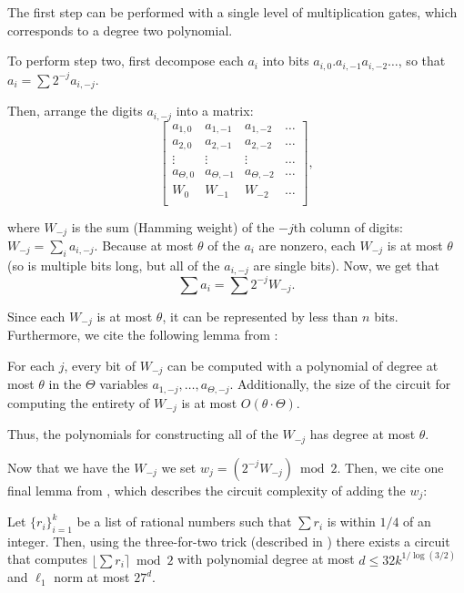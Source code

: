     The first step can be performed with a single level of multiplication gates, which corresponds to a degree two polynomial.

    To perform step two, first decompose each $a_i$ into bits $a_{i, 0} . a_{i, -1} a_{i, -2} \dots$, so that $a_i = \sum 2^{-j} a_{i, -j}$.

    Then, arrange the digits $a_{i, -j}$ into a matrix:
    \[\begin{bmatrix}
        a_{1, 0} & a_{1, -1} & a_{1, -2} & \dots \\
        a_{2, 0} & a_{2, -1} & a_{2, -2} & \dots \\
        \vdots & \vdots & \vdots & \dots \\
        a_{\Theta, 0} & a_{\Theta, -1} & a_{\Theta, -2} & \dots \\
        W_{0} & W_{-1} & W_{-2} & \dots \\
    \end{bmatrix},\]

    where $W_{-j}$ is the sum (Hamming weight) of the $-j$th column of digits: $W_{-j} = \sum_i a_{i, -j}$. Because at most $\theta$ of the $a_i$ are nonzero, each $W_{-j}$ is at most $\theta$ (so is multiple bits long, but all of the $a_{i, -j}$ are single bits). Now, we get that \[\sum a_i = \sum 2^{-j} W_{-j}.\]

    Since each $W_{-j}$ is at most $\theta$, it can be represented by less than $n$ bits. Furthermore, we cite the following lemma from \cite{dghv}:
    \begin{lemma}
        For each $j$, every bit of $W_{-j}$ can be computed with a polynomial of degree at most $\theta$ in the $\Theta$ variables $a_{1, -j}, \dots, a_{\Theta, -j}$. Additionally, the size of the circuit for computing the entirety of $W_{-j}$ is at most $O(\theta \cdot \Theta)$.
    \end{lemma}

    Thus, the polynomials for constructing all of the $W_{-j}$ has degree at most $\theta$.


    Now that we have the $W_{-j}$ we set $w_j = (2^{-j} W_{-j}) \bmod 2$. Then, we cite one final lemma from \cite{dghv}, which describes the circuit complexity of adding the $w_j$:
    \begin{lemma}
        Let $\{r_i\}_{i = 1}^k$ be a list of rational numbers such that $\sum r_i$ is within $1/4$ of an integer. Then, using the three-for-two trick (described in \cite{dghv}) there exists a circuit that computes $\lfloor \sum r_i \rceil \bmod 2$ with polynomial degree at most $d \leq 32 k^{1 / \log(3/2)}$ and $\ell_1$ norm at most $27^d$.
    \end{lemma}

